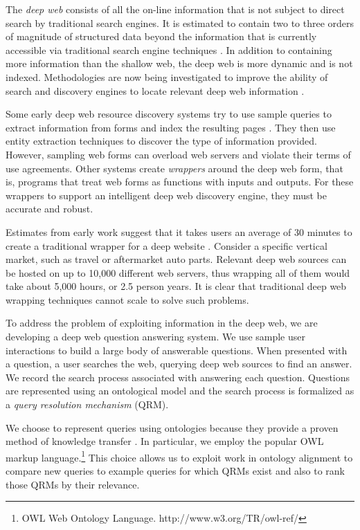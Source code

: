 \documentclass{IOS-Book-Article}
\begin{document}
The \emph{deep web} consists of all the on-line information that is not subject to direct search by traditional search engines.  It is estimated to contain two to three orders of magnitude of structured data beyond the information that is currently accessible via traditional search engine techniques \cite{1454163}.  In addition to containing more information than the shallow web, the deep web is more dynamic and is not indexed.  Methodologies are now being investigated to improve the ability of search and discovery engines to locate relevant deep web information \cite{1080042, 1244355, 1065407, 1060760}.

Some early deep web resource discovery systems try to use sample queries to extract information from forms and index the resulting pages \cite{10.1109/WIIAT.2008.392}. They then use entity extraction techniques to discover the type of information provided.  However, sampling web forms can overload web servers and violate their terms of use agreements.  Other systems create \emph{wrappers} around the deep web form, that is, programs that treat web forms as functions with inputs and outputs.  For these wrappers to support an intelligent deep web discovery engine, they must be accurate and robust.

Estimates from early work suggest that it takes users an average of 30 minutes to create a traditional wrapper for a deep website \cite{transformscout}.  Consider a specific vertical market, such as travel or aftermarket auto parts. Relevant deep web sources can be hosted on up to 10,000 different web servers, thus wrapping all of them would take about 5,000 hours, or 2.5 person years.  It is clear that traditional deep web wrapping techniques cannot scale to solve such problems.

To address the problem of exploiting information in the deep web, we are developing a deep web question answering system.  We use sample user interactions to build a large body of answerable questions. When presented with a question, a user searches the web, querying deep web sources to find an answer. We record the search process associated with answering each question. Questions are represented using an ontological model and the search process is formalized as a \emph{query resolution mechanism} (QRM).

We choose to represent queries using ontologies because they provide a proven method of knowledge transfer \cite{DBLP:conf/kr/CiocoiuN00}. In particular, we employ the popular OWL markup language.\footnote{OWL Web Ontology Language. http://www.w3.org/TR/owl-ref/} This choice allows us to exploit work in ontology alignment to compare new queries to example queries for which QRMs exist and also to rank those QRMs by their relevance.
\end{document}
